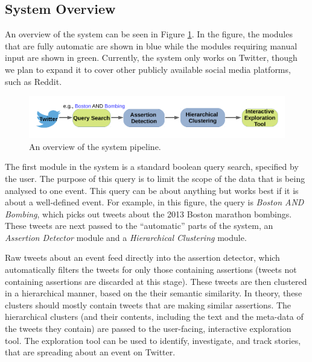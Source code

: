 \documentclass[letterpaper]{article}
\begin{document}
\subsection{System Overview}
An overview of the system can be seen in Figure \ref{fig:pipeline}. In the figure, the modules that are fully automatic are shown in blue while the modules requiring manual input are shown in green. Currently, the system only works on Twitter, though we plan to expand it to cover other publicly available social media platforms, such as Reddit.

\begin{figure}[h]
\centering
\includegraphics[width=1.\columnwidth]{pipeline1_2.pdf}
\caption{An overview of the system pipeline.}
\label{fig:pipeline}
\end{figure}


The first module in the system is a standard boolean query search, specified by the user. The purpose of this query is to limit the scope of the data that is being analysed to one event. This query can be about anything but works best if it is about a well-defined event. For example, in this figure, the query is \emph{Boston AND Bombing}, which picks out tweets about the 2013 Boston marathon bombings. These tweets are next passed to the ``automatic'' parts of the system, an \emph{Assertion Detector} module and a \emph{Hierarchical Clustering} module.

Raw tweets about an event feed directly into the assertion detector, which automatically filters the tweets for only those containing assertions (tweets not containing assertions are discarded at this stage). These tweets are then clustered in a hierarchical manner, based on the their semantic similarity. In theory, these clusters should mostly contain tweets that are making similar assertions. The hierarchical clusters (and their contents, including the text and the meta-data of the tweets they contain) are passed to the user-facing, interactive exploration tool. The exploration tool can be used to identify, investigate, and track stories, that are spreading about an event on Twitter.

\end{document}
